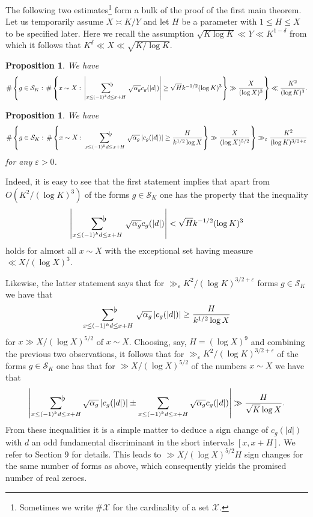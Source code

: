 \documentclass[a4paper,10pt,twoside]{amsart}
\newtheorem{prop}[theorem]{Proposition}
\theoremstyle{definition}
\numberwithin{equation}{section}
\renewcommand\:{\colon}
\newcommand{\sumflat}{\mathop{{\sum}^{\raisebox{-3pt}{\makebox[0pt][l]{$\flat$}}}}}
\begin{document}
The following two estimates\footnote{Sometimes we write $\#\mathcal X$ for the cardinality of a set $\mathcal X$.} form a bulk of the proof of the first main theorem. Let us temporarily assume $X\asymp K/Y$ and let $H$ be a parameter with $1\leq H\leq X$ to be specified later. Here we recall the assumption $\sqrt{K\log K}\ll Y\ll K^{1-\delta}$ from which it follows that $K^\delta\ll X\ll\sqrt{K/\log K}$.

\begin{prop}\label{Prop1}
We have 
\[\#\left\{g\in\mathcal S_K:\,\#\left\{x\sim X:\,\left|\sumflat_{x\leq (-1)^kd\leq x+H}\,\sqrt{\alpha_g}c_g(|d|)\right|\geq \sqrt H k^{-1/2}(\log K)^3\right\}\gg \frac X{(\log X)^3}\right\}\ll \frac{K^{2}}{(\log K)^3}.\]
\end{prop}

\begin{prop}\label{Prop2}
We have
\[\#\left\{g\in\mathcal S_K:\,\#\left\{x\sim X:\,\sumflat_{x\leq (-1)^kd\leq x+H}\,\sqrt{\alpha_g}\left|c_g(|d|)\right|\geq\frac H{k^{1/2}\log X}\right\}\gg \frac X{(\log X)^{5/2}}\right\}\gg_\varepsilon\frac{K^2}{(\log K)^{3/2+\varepsilon}}\]
for any $\varepsilon>0$.
\end{prop}

\noindent Indeed, it is easy to see that the first statement implies that apart from $O(K^2/(\log K)^3)$ of the forms $g\in\mathcal S_K$ one has the property that the inequality 
\[\left|\sumflat_{x\leq (-1)^kd\leq x+H}\,\sqrt{\alpha_g}c_g(|d|)\right|<\sqrt H k^{-1/2}(\log K)^3\]
holds for almost all $x\sim X$ with the exceptional set having measure $\ll X/(\log X)^3$.

Likewise, the latter statement says that for $\gg_\varepsilon K^2/(\log K)^{3/2+\varepsilon}$ forms $g\in\mathcal S_K$ we have that 
\[\sumflat_{x\leq (-1)^kd\leq x+H}\,\sqrt{\alpha_g}\left|c_g(|d|)\right|\geq\frac H{k^{1/2}\log X}\]
for $x\gg X/(\log X)^{5/2}$ of $x\sim X$. Choosing, say, $H=(\log X)^9$ and combining the previous two observations, it follows that for $\gg_\varepsilon K^2/(\log K)^{3/2+\varepsilon}$ of the forms $g\in\mathcal S_K$ one has that for $\gg X/(\log X)^{5/2}$ of the numbers $x\sim X$ we have that 
\[ 
\left|\sumflat_{x\leq (-1)^kd\leq x+H}\sqrt{\alpha_g}\left|c_g(|d|)\right|\pm\sum_{x\leq(-1)^kd\leq x+H}\sqrt{\alpha_g}c_g(|d|)\right|\gg\frac H{\sqrt K\log X}.\]
From these inequalities it is a simple matter to deduce a sign change of $c_g(|d|)$ with $d$ an odd fundamental discriminant in the short intervals $[x,x+H]$. We refer to Section $9$ for details. This leads to $\gg X/(\log X)^{5/2}H$ sign changes for the same number of forms as above, which consequently yields the promised number of real zeroes. 
\end{document}
